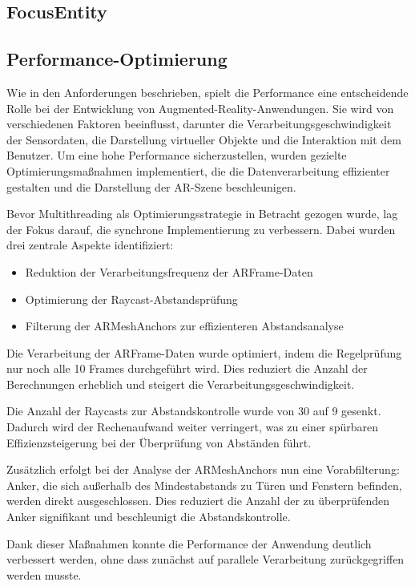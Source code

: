 \subsection{FocusEntity}

\subsection{Performance-Optimierung}
Wie in den Anforderungen beschrieben, spielt die Performance eine entscheidende Rolle bei der Entwicklung von Augmented-Reality-Anwendungen. Sie wird von verschiedenen Faktoren beeinflusst, darunter die Verarbeitungsgeschwindigkeit der Sensordaten, die Darstellung virtueller Objekte und die Interaktion mit dem Benutzer. Um eine hohe Performance sicherzustellen, wurden gezielte Optimierungsmaßnahmen implementiert, die die Datenverarbeitung effizienter gestalten und die Darstellung der AR-Szene beschleunigen.

Bevor Multithreading als Optimierungsstrategie in Betracht gezogen wurde, lag der Fokus darauf, die synchrone Implementierung zu verbessern. Dabei wurden drei zentrale Aspekte identifiziert:

\begin{itemize}
\item Reduktion der Verarbeitungsfrequenz der ARFrame-Daten
\item Optimierung der Raycast-Abstandsprüfung
\item Filterung der ARMeshAnchors zur effizienteren Abstandsanalyse
\end{itemize}

Die Verarbeitung der ARFrame-Daten wurde optimiert, indem die Regelprüfung nur noch alle 10 Frames durchgeführt wird. Dies reduziert die Anzahl der Berechnungen erheblich und steigert die Verarbeitungsgeschwindigkeit.

Die Anzahl der Raycasts zur Abstandskontrolle wurde von 30 auf 9 gesenkt. Dadurch wird der Rechenaufwand weiter verringert, was zu einer spürbaren Effizienzsteigerung bei der Überprüfung von Abständen führt.

Zusätzlich erfolgt bei der Analyse der ARMeshAnchors nun eine Vorabfilterung: Anker, die sich außerhalb des Mindestabstands zu Türen und Fenstern befinden, werden direkt ausgeschlossen. Dies reduziert die Anzahl der zu überprüfenden Anker signifikant und beschleunigt die Abstandskontrolle.

Dank dieser Maßnahmen konnte die Performance der Anwendung deutlich verbessert werden, ohne dass zunächst auf parallele Verarbeitung zurückgegriffen werden musste.

